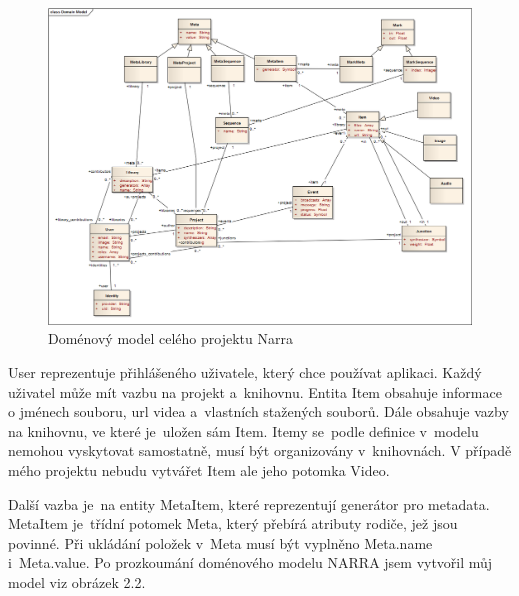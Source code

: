\begin{figure}[H]
\includegraphics[width=1\textwidth]{./obrazova_priloha/domain_model.png}
\caption{Doménový model celého projektu Narra}
\end{figure}

\par User reprezentuje přihlášeného uživatele, který chce používat aplikaci. Každý uživatel může mít vazbu na projekt a~knihovnu. Entita Item obsahuje informace o jménech souboru, url videa a~vlastních stažených souborů. Dále obsahuje vazby na knihovnu, ve které je~uložen sám Item. Itemy se~podle definice v~modelu nemohou vyskytovat samostatně, musí být organizovány v~knihovnách. V případě mého projektu nebudu vytvářet Item ale jeho potomka Video. 
\par Další vazba je~na entity MetaItem, které reprezentují generátor pro metadata. MetaItem je~třídní potomek Meta, který přebírá atributy rodiče, jež jsou povinné. Při ukládání položek v~Meta musí být vyplněno Meta.name i~Meta.value. Po prozkoumání doménového modelu NARRA jsem vytvořil můj model viz obrázek 2.2.

